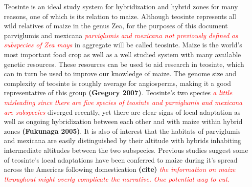 \documentclass[12pt]{amsart}
\newcommand{\mbh}[1]{\textcolor{red}{ \emph{\scriptsize  #1}} }
\begin{document}
Teosinte is an ideal study system for hybridization and hybrid zones for many reasons, one of which is its relation to maize.  
Although teosinte represents all wild relatives of maize in the genus {Zea}, for the purposes of this document parviglumis and mexicana \mbh{\emph{parviglumis} and \emph{mexicana} not previously defined as subspecies of \emph{Zea mays}} in aggregate will be called teosinte. 
Maize is the world's most important food crop as well as a well studied system with many available genetic resources.
These resources can be used to aid research in teosinte, which can in turn be used to improve our knowledge of maize.
The genome size and complexity of teosinte is roughly average for angiosperms, making it a good representative of this group \textbf{(Gregory 2007)}. 
Teosinte's two species \mbh{a little misleading since there are five species of teosinte and \emph{parviglumis} and \emph{mexicana} are subspecies} diverged recently, yet there are clear signs of local adaptation as well as ongoing hybridization between each other and with maize within hybrid zones \textbf{(Fukunaga 2005)}.
It is also of interest that the habitats of parviglumis and mexicana are easily distinguished by their altitude with hybrids inhabiting intermediate altitudes between the two subspecies.
Previous studies suggest some of teosinte's local adaptations have been conferred to maize during it's spread across the Americas following domestication \textbf{(cite)} \mbh{the information on maize throughout might overly complicate the narrative.  One potential way to cut.} %
\end{document}
